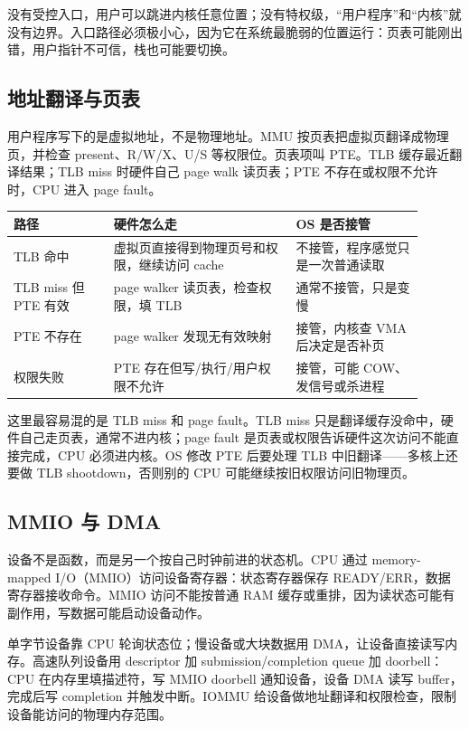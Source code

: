 没有受控入口，用户可以跳进内核任意位置；没有特权级，“用户程序”和“内核”就没有边界。入口路径必须极小心，因为它在系统最脆弱的位置运行：页表可能刚出错，用户指针不可信，栈也可能要切换。

\subsection{地址翻译与页表}

用户程序写下的是虚拟地址，不是物理地址。MMU 按页表把虚拟页翻译成物理页，并检查 present、R/W/X、U/S 等权限位。页表项叫 PTE。TLB 缓存最近翻译结果；TLB miss 时硬件自己 page walk 读页表；PTE 不存在或权限不允许时，CPU 进入 page fault。

\begin{longtable}{p{0.22\linewidth}p{0.4\linewidth}p{0.28\linewidth}}
\toprule
路径 & 硬件怎么走 & OS 是否接管 \\
\midrule
TLB 命中 & 虚拟页直接得到物理页号和权限，继续访问 cache & 不接管，程序感觉只是一次普通读取 \\
TLB miss 但 PTE 有效 & page walker 读页表，检查权限，填 TLB & 通常不接管，只是变慢 \\
PTE 不存在 & page walker 发现无有效映射 & 接管，内核查 VMA 后决定是否补页 \\
权限失败 & PTE 存在但写/执行/用户权限不允许 & 接管，可能 COW、发信号或杀进程 \\
\bottomrule
\end{longtable}

这里最容易混的是 TLB miss 和 page fault。TLB miss 只是翻译缓存没命中，硬件自己走页表，通常不进内核；page fault 是页表或权限告诉硬件这次访问不能直接完成，CPU 必须进内核。OS 修改 PTE 后要处理 TLB 中旧翻译——多核上还要做 TLB shootdown，否则别的 CPU 可能继续按旧权限访问旧物理页。

\subsection{MMIO 与 DMA}

设备不是函数，而是另一个按自己时钟前进的状态机。CPU 通过 memory-mapped I/O（MMIO）访问设备寄存器：状态寄存器保存 READY/ERR，数据寄存器接收命令。MMIO 访问不能按普通 RAM 缓存或重排，因为读状态可能有副作用，写数据可能启动设备动作。

单字节设备靠 CPU 轮询状态位；慢设备或大块数据用 DMA，让设备直接读写内存。高速队列设备用 descriptor 加 submission/completion queue 加 doorbell：CPU 在内存里填描述符，写 MMIO doorbell 通知设备，设备 DMA 读写 buffer，完成后写 completion 并触发中断。IOMMU 给设备做地址翻译和权限检查，限制设备能访问的物理内存范围。

